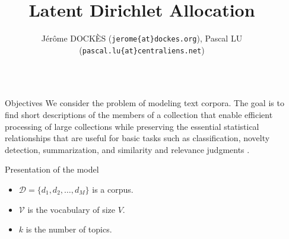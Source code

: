 \documentclass[final]{beamer}
\title{Latent Dirichlet Allocation} %
\author{J\'er\^ome DOCK\`ES {\small{(\texttt{jerome\{at\}dockes.org})}}, Pascal LU  {\small{(\texttt{pascal.lu\{at\}centraliens.net})}} } %
\institute{\'Ecole Normale Sup\'erieure de Cachan $-$ \today} %
\newlength{\sepwid}
\newlength{\onecolwid}
\begin{document}

\setlength{\belowcaptionskip}{2ex} %
\setlength\belowdisplayshortskip{2ex} %

\begin{frame}[t] %

\begin{columns}[t] %

\begin{column}{\sepwid}\end{column} %

\begin{column}{\onecolwid} %


\begin{alertblock}{Objectives}
We consider the problem of modeling text corpora. The goal is to find short descriptions of the members of a collection that enable efficient processing of large collections while preserving the essential statistical relationships that are useful for basic tasks such as classification, novelty detection, summarization, and similarity and relevance judgments  \cite{BNJ03}.
\end{alertblock}


\begin{block}{Presentation of the model}

\begin{itemize}
  \item $\mathcal{D} = \{d_{1},d_{2}, \ldots, d_{M}\}$ is a corpus.
  \item $\mathcal{V}$ is the vocabulary of size $V$.
  \item $k$ is the number of topics.
\end{itemize}


\end{block}
\end{column}
\end{columns}
\end{frame}
\end{document}
